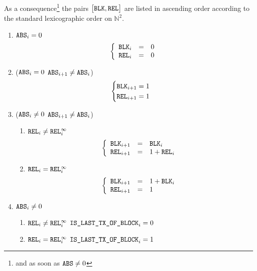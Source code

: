 As a consequence\footnote{and as soon as $\texttt{ABS} \neq 0$} the pairs $\big[\texttt{BLK}, \texttt{REL}\big]$ are listed in ascending order according to the standard lexicographic order on $\mathbb{N}^2$.
\begin{enumerate}[resume]
	\item \If $\texttt{ABS}_{i} = 0$ \Then
		\[
			\left\{\begin{array}{lcl}
				\texttt{BLK}_{i}   & = & 0 \\
				\texttt{REL}_{i}      & = & 0 \\
			\end{array}\right.
		\]
	\item \If \big($\texttt{ABS}_{i} = 0$ \et $\texttt{ABS}_{i + 1} \neq \texttt{ABS}_{i}$\big) \Then 
		\[
			\begin{cases}
				\texttt{BLK}_{i + 1} = 1 \\
				\texttt{REL}_{i + 1} = 1 \\
			\end{cases}
		\]
	\item \If \big($\texttt{ABS}_{i} \neq 0$ \et $\texttt{ABS}_{i + 1} \neq \texttt{ABS}_{i}$\big) \Then
		\begin{enumerate}
			\item \If $\texttt{REL}_{i} \neq \texttt{REL}^\infty_{i}$ \Then
				\[
					\left\{\begin{array}{lcl}
						\texttt{BLK}_{i + 1} & = & \texttt{BLK}_{i} \\
						\texttt{REL}_{i + 1}    & = & 1 + \texttt{REL}_{i} \\
					\end{array}\right.
				\]
			\item \If $\texttt{REL}_{i} =    \texttt{REL}^\infty_{i}$ \Then 
				\[
					\left\{\begin{array}{lcl}
						\texttt{BLK}_{i + 1} & = & 1 + \texttt{BLK}_{i} \\
						\texttt{REL}_{i + 1}    & = & 1 \\
					\end{array}\right.
				\]
		\end{enumerate}
	\item \If $\texttt{ABS}_{i} \neq 0$ \Then
		\begin{enumerate}
			\item \If $\texttt{REL}_{i} \neq \texttt{REL}^\infty_{i}$ \Then $\texttt{IS\_LAST\_TX\_OF\_BLOCK}_{i} = 0$
			\item \If $\texttt{REL}_{i} =    \texttt{REL}^\infty_{i}$ \Then $\texttt{IS\_LAST\_TX\_OF\_BLOCK}_{i} = 1$
		\end{enumerate}
\end{enumerate}
